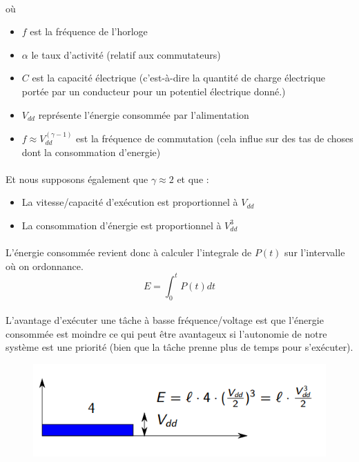 \paragraph{}
où 
\begin{itemize}
\item $f$ est la fréquence de l'horloge
\item $\alpha$ le taux d'activité (relatif aux commutateurs)
\item $C$ est la capacité électrique (c'est-à-dire la quantité de charge électrique portée par un conducteur pour un potentiel électrique donné.)
\item $V_{dd}$ représente l'énergie consommée par l'alimentation
\item $f \approx V_{dd}^{(\gamma -1)}$	est la fréquence de commutation (cela influe sur des tas de choses dont la consommation d'energie)
\end{itemize}
\paragraph{}
Et nous supposons également que $\gamma \approx 2$ et que :
\begin{itemize}
\item La vitesse/capacité d'exécution est proportionnel à $V_{dd}$
\item La consommation d'énergie est proportionnel à $V_{dd}^3$
\end{itemize}
\paragraph{}
L'énergie consommée revient donc à calculer l'integrale de $P(t)$ sur l'intervalle où on ordonnance.
\begin{equation*}
E = \int_{0}^{t} P(t) dt
\end{equation*}
\paragraph{}
L'avantage d'exécuter une tâche à basse fréquence/voltage est que l'énergie consommée est moindre ce qui peut être avantageux si l'autonomie de notre système est une priorité (bien que la tâche prenne plus de temps pour s'exécuter).
\begin{figure}[H]
\centering
\includegraphics{img_6_1__0}
\end{figure}

